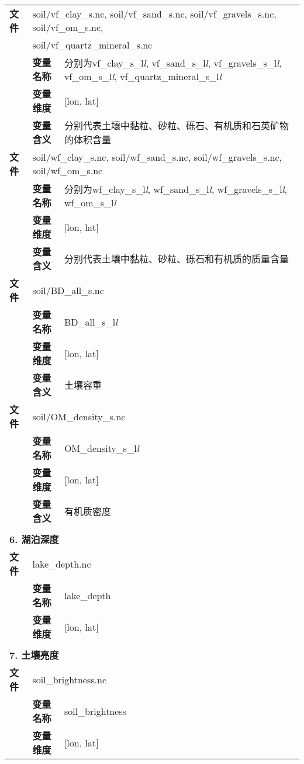 {\begin{longtable}{llp{}}
\cline{1-3}
\textbf{文件} & \multicolumn{2}{l}{soil/vf\_clay\_s.nc, soil/vf\_sand\_s.nc, soil/vf\_gravels\_s.nc, soil/vf\_om\_s.nc, } \\
 & \multicolumn{2}{l}{soil/vf\_quartz\_mineral\_s.nc} \\
\cline{2-3}
& \textbf{变量名称} & 分别为vf\_clay\_s\_l\textit{l}, vf\_sand\_s\_l\textit{l}, vf\_gravels\_s\_l\textit{l}, vf\_om\_s\_l\textit{l}, vf\_quartz\_mineral\_s\_l\textit{l} \\
& \textbf{变量维度} & {[}lon, lat{]} \\
& \textbf{变量含义} & 分别代表土壤中黏粒、砂粒、砾石、有机质和石英矿物的体积含量 \\
\cline{1-3}
\textbf{文件} & \multicolumn{2}{l}{soil/wf\_clay\_s.nc, soil/wf\_sand\_s.nc, soil/wf\_gravels\_s.nc, soil/wf\_om\_s.nc} \\
\cline{2-3}
& \textbf{变量名称} & 分别为wf\_clay\_s\_l\textit{l}, wf\_sand\_s\_l\textit{l}, wf\_gravels\_s\_l\textit{l}, wf\_om\_s\_l\textit{l} \\
& \textbf{变量维度} & {[}lon, lat{]} \\
& \textbf{变量含义} & 分别代表土壤中黏粒、砂粒、砾石和有机质的质量含量 \\
\cline{1-3}
\textbf{文件} & \multicolumn{2}{l}{soil/BD\_all\_s.nc} \\
\cline{2-3}
& \textbf{变量名称} & BD\_all\_s\_l\textit{l} \\
& \textbf{变量维度} & {[}lon, lat{]} \\
& \textbf{变量含义} & 土壤容重 \\
\cline{1-3}
\textbf{文件} & \multicolumn{2}{l}{soil/OM\_density\_s.nc} \\
\cline{2-3}
& \textbf{变量名称} & OM\_density\_s\_l\textit{l} \\
& \textbf{变量维度} & {[}lon, lat{]} \\
& \textbf{变量含义} & 有机质密度 \\


\midrule
\vspace{2\baselineskip}\\
 \multicolumn{3}{l}{\textbf{6. 湖泊深度}} \\
\cline{1-3}
\textbf{文件} & \multicolumn{2}{l}{lake\_depth.nc} \\
\cline{2-3}
& \textbf{变量名称} & lake\_depth \\
& \textbf{变量维度} & {[}lon, lat{]} \\

\midrule
\vspace{2\baselineskip}\\
 \multicolumn{3}{l}{\textbf{7. 土壤亮度}} \\
\cline{1-3}
\textbf{文件} & \multicolumn{2}{l}{soil\_brightness.nc} \\
\cline{2-3}
& \textbf{变量名称} & soil\_brightness \\
& \textbf{变量维度} & {[}lon, lat{]} \\


\end{longtable}}
